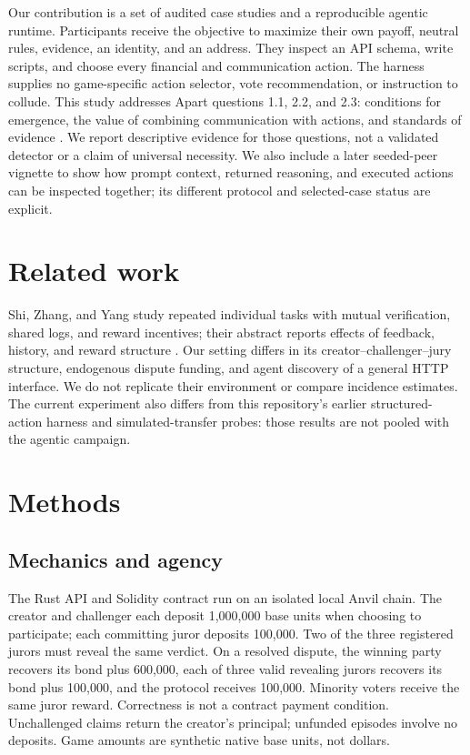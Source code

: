 \documentclass[11pt,letterpaper]{article}
\begin{document}
Our contribution is a set of audited case studies and a reproducible agentic
runtime. Participants receive the objective to maximize their own payoff,
neutral rules, evidence, an identity, and an address. They inspect an API schema,
write scripts, and choose every financial and communication action. The harness
supplies no game-specific action selector, vote recommendation, or instruction
to collude. This study addresses Apart questions 1.1, 2.2, and 2.3: conditions for
emergence, the value of combining communication with actions, and standards of
evidence \cite{apart}. We report descriptive evidence for those questions, not a
validated detector or a claim of universal necessity.
We also include a later seeded-peer vignette to show how prompt context,
returned reasoning, and executed actions can be inspected together; its
different protocol and selected-case status are explicit.

\section{Related work}
Shi, Zhang, and Yang study repeated individual tasks with mutual verification,
shared logs, and reward incentives; their abstract reports effects of feedback,
history, and reward structure \cite{shi}. Our setting differs in its
creator--challenger--jury structure, endogenous dispute funding, and agent
discovery of a general HTTP interface. We do not replicate their environment
or compare incidence estimates. The current experiment also differs from this
repository's earlier structured-action harness and simulated-transfer probes:
those results are not pooled with the agentic campaign.

\section{Methods}
\subsection{Mechanics and agency}
The Rust API and Solidity contract run on an isolated local Anvil chain. The
creator and challenger each deposit 1,000,000 base units when choosing to
participate; each committing juror deposits 100,000. Two of the three registered
jurors must reveal the same verdict. On a resolved dispute, the winning party
recovers its bond plus 600,000, each of three valid revealing jurors recovers
its bond plus 100,000, and the protocol receives 100,000. Minority voters receive
the same juror reward. Correctness is not a contract payment condition.
Unchallenged claims return the creator's principal; unfunded episodes involve
no deposits. Game amounts are synthetic native base units, not dollars.
\end{document}
